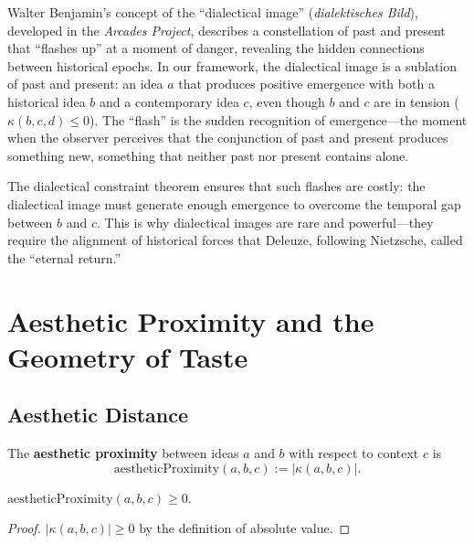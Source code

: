 \begin{remark}
Walter Benjamin's concept of the ``dialectical image'' (\emph{dialektisches Bild}), developed in the \emph{Arcades Project}, describes a constellation of past and present that ``flashes up'' at a moment of danger, revealing the hidden connections between historical epochs.  In our framework, the dialectical image is a sublation of past and present: an idea $a$ that produces positive emergence with both a historical idea $b$ and a contemporary idea $c$, even though $b$ and $c$ are in tension ($\kappa(b, c, d) \leq 0$).  The ``flash'' is the sudden recognition of emergence---the moment when the observer perceives that the conjunction of past and present produces something new, something that neither past nor present contains alone.

The dialectical constraint theorem ensures that such flashes are costly: the dialectical image must generate enough emergence to overcome the temporal gap between $b$ and $c$.  This is why dialectical images are rare and powerful---they require the alignment of historical forces that Deleuze, following Nietzsche, called the ``eternal return.''
\end{remark}

\section{Aesthetic Proximity and the Geometry of Taste}
\label{sec:math-aesthetics:proximity}

\subsection{Aesthetic Distance}

\begin{definition}
\label{def:aesthetic-proximity}
The \textbf{aesthetic proximity} between ideas $a$ and $b$ with respect
to context $c$ is
\[
  \mathrm{aestheticProximity}(a, b, c) := |\kappa(a, b, c)|.
\]
\end{definition}

\begin{theorem}
\label{thm:prox-nonneg}
$\mathrm{aestheticProximity}(a, b, c) \geq 0$.
\end{theorem}

\begin{proof}
$|\kappa(a, b, c)| \geq 0$ by the definition of absolute value.
\end{proof}

